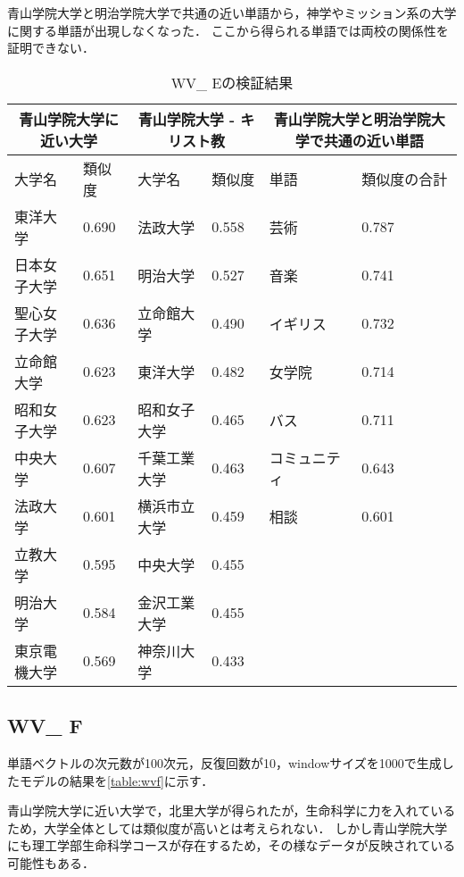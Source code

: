 青山学院大学と明治学院大学で共通の近い単語から，神学やミッション系の大学に関する単語が出現しなくなった．
ここから得られる単語では両校の関係性を証明できない．

\begin{table}[H]
\caption{WV\_ Eの検証結果}
\centering
\footnotesize
\begin{tabular}{ll|ll|ll}
\hline
\multicolumn{2}{c}{青山学院大学に近い大学} & \multicolumn{2}{c}{青山学院大学 - キリスト教} & \multicolumn{2}{c}{青山学院大学と明治学院大学で共通の近い単語}
\\ \hline
大学名 & 類似度 & 大学名 & 類似度 & 単語 & 類似度の合計
\\ \hline \hline
東洋大学 & 0.690 & 法政大学 & 0.558 & 芸術 & 0.787\\
日本女子大学 & 0.651 & 明治大学 & 0.527 & 音楽 & 0.741\\
聖心女子大学 & 0.636 & 立命館大学 & 0.490 & イギリス & 0.732\\
立命館大学 & 0.623 & 東洋大学 & 0.482 & 女学院 & 0.714\\
昭和女子大学 & 0.623 & 昭和女子大学 & 0.465 & バス & 0.711\\
中央大学 & 0.607 & 千葉工業大学 & 0.463 & コミュニティ & 0.643\\
法政大学 & 0.601 & 横浜市立大学 & 0.459 & 相談 & 0.601\\
立教大学 & 0.595 & 中央大学 & 0.455 & & \\
明治大学 & 0.584 & 金沢工業大学 & 0.455 & & \\
東京電機大学 & 0.569 & 神奈川大学 & 0.433 & & \\ \hline
\end{tabular}
\label{table:wve}
\end{table}

\subsection{WV\_ F}
単語ベクトルの次元数が100次元，反復回数が10，windowサイズを1000で生成したモデルの結果を\ref{table:wvf}に示す．

青山学院大学に近い大学で，北里大学が得られたが，生命科学に力を入れているため，大学全体としては類似度が高いとは考えられない．
しかし青山学院大学にも理工学部生命科学コースが存在するため，その様なデータが反映されている可能性もある．

